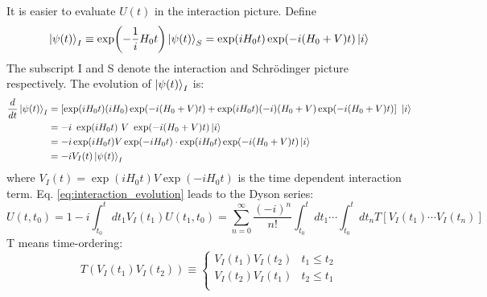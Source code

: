 It is easier to evaluate $U(t)$ in the interaction picture. Define
\begin{equation}
    \ket{\psi(t)}_I \equiv \exp(-\frac{1}{i}H_0 t) \ket{\psi(t)}_S 
    = \exp(iH_0 t) \exp(-i (H_0 + V) t)\ket{i}
\end{equation}
The subscript I and S denote the interaction and Schr\"odinger picture respectively.
The evolution of $\ket{\psi(t)}_I$ is:
\begin{equation}
    \begin{aligned}
	\frac{d}{dt}\ket{\psi(t)}_I 
	&= \left[ \exp(i H_0 t) (iH_0) \exp(-i (H_0 + V) t)
	+ \exp(i H_0 t) (-i)(H_0 + V) \exp(-i (H_0 + V) t) \right] \ \ket{i}  \\
	&= -i\ \exp(i H_0 t)\ V \ \exp(-i (H_0 + V) t) \ket{i}   \\
	&= -i \exp(iH_0 t) V \exp(-iH_0 t) \cdot \exp(iH_0 t) \exp(-i(H_0 + V)t) \ket{i}   \\
	&= -i V_I(t) \ket{\psi(t)}_I
    \end{aligned}
    \label{eq:interaction_evolution}
\end{equation}
where $V_I(t) = \exp(iH_0t)V\exp(-iH_0t)$ is the time dependent interaction term.
Eq. \ref{eq:interaction_evolution} leads to the Dyson series:
\begin{equation}
    U(t, t_0) = 1 - i\int_{t_0}^t dt_1 V_I(t_1) U(t_1, t_0) = \sum_{n=0}^\infty \frac{(-i)^n}{n!}\int_{t_0}^t dt_1 \cdots \int_{t_0}^t dt_n T[V_I(t_1)\cdots V_I(t_n)]
\end{equation}
T means time-ordering:
\begin{equation}
    T(V_I(t_1) V_I(t_2)) \equiv 
    \begin{cases}
	V_I(t_1)V_I(t_2)    & t_1 \le t_2   \\
	V_I(t_2)V_I(t_1)    & t_2 \le t_1   \\
    \end{cases}
\end{equation}

